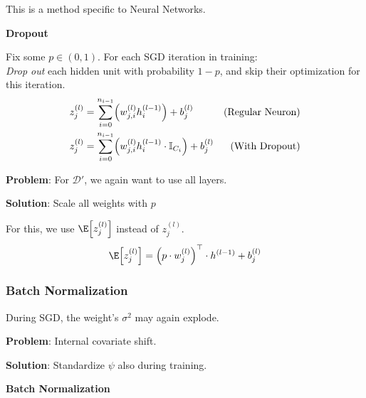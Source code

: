 This is a method specific to Neural Networks.

\method \textbf{Dropout}

Fix some $p \in (0,1)$. For each SGD iteration in training:\\
\textit{Drop out} each hidden unit with probability $1-p$, and skip their optimization for this iteration.
\begin{align*}
    z_j^{(l)} &= \sum_{i=0}^{n_{i-1}}\Bigl( w_{j,i}^{(l)}h_i^{(l-1)} \Bigr) + b_j^{(l)}                         & \text{(Regular Neuron)}       \\
    z_j^{(l)} &= \sum_{i=0}^{n_{i-1}}\Bigl( w_{j,i}^{(l)}h_i^{(l-1)} \cdot \mathbb{I}_{C_i} \Bigr) + b_j^{(l)}  & \text{(With Dropout)}
\end{align*}

\textbf{Problem}: For $\mathcal{D}'$, we again want to use all layers.

\textbf{Solution}: Scale all weights with $p$


For this, we use $\E\Bigl[ z_j^{(l)} \Bigr]$ instead of $z_j^{(l)}$.
\begin{align*}
    \E\Bigl[ z_j^{(l)} \Bigr] = \Bigl( p\cdot w_j^{(l)} \Bigr)^\top \cdot h^{(l-1)} + b_j^{(l)}
\end{align*}

\subsubsection{Batch Normalization}

During SGD, the weight's $\sigma^2$ may again explode.\\

\textbf{Problem}: Internal covariate shift.\\

\textbf{Solution}: Standardize $\psi$ also during training.

\newpage

\method \textbf{Batch Normalization}


